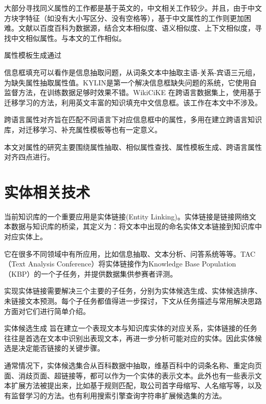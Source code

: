 大部分寻找同义属性的工作都是基于英文的，中文相关工作较少。并且，由于中文方块字特征（如没有大小写区分、没有空格等），基于中文属性的工作则更加困难。文献\cite{liu2014extracting}以百度百科为数据源，结合文本相似度、语义相似度、上下文相似度，寻找中文相似属性。与本文的工作相似。

{\heiti 属性模板生成}通过

{\heiti 信息框填充}可以看作是信息抽取问题，从词条文本中抽取主语-关系-宾语三元组，为缺失属性抽取属性值。KYLIN\cite{wu2007autonomously}是第一个解决信息框缺失问题的系统，它使用自监督方法，在训练数据足够时效果不错。WikiCiKE\cite{wang2013transfer} 在跨语言数据集上，使用基于迁移学习的方法，利用英文丰富的知识填充中文信息框。该工作在本文中不涉及。

{\heiti 跨语言属性对齐}旨在匹配不同语言下对应信息框中的属性，多用在建立跨语言知识库，对迁移学习、补充属性模板等也有一定意义。

本文对属性的研究主要围绕属性抽取、相似属性查找、属性模板生成、跨语言属性对齐四点进行。


\section{实体相关技术}
\label{sec:entity-research}

当前知识库的一个重要应用是实体链接(Entity Linking)。实体链接是链接网络文本数据与知识库的桥梁，其定义为：将文本中出现的命名实体文本链接到知识库中对应实体上。

它在很多不同领域中有所应用，比如信息抽取\cite{lin2012entity,nakashole2012patty}、文本分析\cite{gattani2013entity}、问答系统\cite{gattani2013entity,welty2012comparison}等等。TAC（Text Analysis Conference）将实体链接作为Knowledge Base Population（KBP）的一个子任务，并提供数据集供参赛者评测。

实现实体链接需要解决三个主要的子任务，分别为实体候选生成、实体候选排序、未链接文本预测。每个子任务都值得进一步探讨，下文从任务描述与常用解决思路方面对它们进行简单介绍。

{\heiti 实体候选生成} 旨在建立一个表现文本与知识库实体的对应关系，实体链接的任务往往是首选在文本中识别出表现文本，再进一步分析可能对应的实体。因此实体候选是决定能否链接的关键步骤。

通常情况下，实体候选集合从百科数据中抽取\cite{bunescu2006using,shen2012linden,shen2013linking}，维基百科中的词条名称、重定向页面、消歧页面、超链接等，都可以作为一个实体的表示文本。此外也有一些表示文本扩展方法被提出来，比如基于规则匹配\cite{han2009nlpr_kbp,lehmann2010lcc}，取公司首字母缩写、人名缩写等，以及有监督学习的方法\cite{zhang2011entity}。也有利用搜索引擎查询字符串扩展候选集的方法\cite{dredze2010entity, monahan2011cross}。

